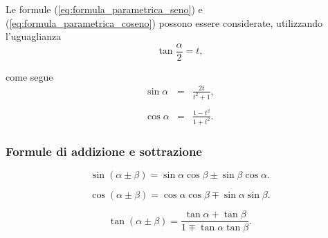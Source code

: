 \addtocounter{footnote}{-2}



Le formule (\ref{eq:formula_parametrica_seno}) e (\ref{eq:formula_parametrica_coseno}) possono essere considerate, utilizzando l'uguaglianza
\begin{equation*}
    \tan\frac{\alpha}{2}=t,
\end{equation*}

come segue
\begin{equation*}
    \begin{matrix}
        \sin\alpha &=& \frac{2t}{t^2+1},\\
        \\
        \cos\alpha &=& \frac{1-t^2}{1+t^2}.
    \end{matrix}
\end{equation*}

\subsubsection{Formule di addizione e sottrazione}
\begin{definition}
    \begin{equation}\label{eq:addizione_sottrazione_seno}
        \sin(\alpha\pm\beta)=\sin\alpha\cos\beta\pm\sin\beta\cos\alpha.
    \end{equation}
\end{definition}

\begin{definition}
    \begin{equation}\label{eq:addizione_sottrazione_coseno}
        \cos(\alpha\pm\beta)=\cos\alpha\cos\beta\mp\sin\alpha\sin\beta.
    \end{equation}
\end{definition}

\begin{definition}
    \begin{equation}\label{eq:addizione_sottrazione_tangente}
        \tan(\alpha\pm\beta)=\frac{\tan\alpha+\tan\beta}{1\mp\tan\alpha\tan\beta}.
    \end{equation}
\end{definition}

